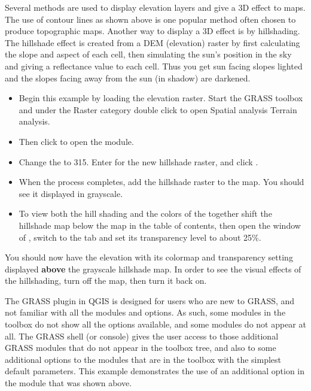 
Several methods are used to display elevation layers and give a 3D effect to
maps. The use of contour lines as shown above is one popular method often
chosen to produce topographic maps. Another way to display a 3D effect is by
hillshading. The hillshade effect is created from a DEM (elevation) raster by
first calculating the slope and aspect of each cell, then simulating the
sun's position in the sky and giving a reflectance value to each cell. Thus
you get sun facing slopes lighted and the slopes facing away from the sun (in
shadow) are darkened.

\begin{itemize}[label=--]
\item Begin this example by loading the  elevation raster.
Start the GRASS toolbox and under the Raster category double click to open Spatial
analysis \arrow Terrain analysis.
\item Then click  to open
the module.
\item Change the  to 315. Enter
 for the new hillshade raster, and click
.
\item When the process completes, add the hillshade raster to the map. You
should see it displayed in grayscale.
\item To view both the hill shading and the colors of the
 together shift the hillshade map below the
 map in the table of contents, then open the
 window of , switch to the
 tab and set its transparency level to about 25\%.
\end{itemize}

You should now have the  elevation with its colormap and
transparency setting displayed \textbf{above} the grayscale hillshade map. In
order to see the visual effects of the hillshading, turn off the
 map, then turn it back on.


The GRASS plugin in QGIS is designed for users who are new to GRASS, and not
familiar with all the modules and options. As such, some modules in the
toolbox do not show all the options available, and some modules do not appear
at all. The GRASS shell (or console) gives the user access to those
additional GRASS modules that do not appear in the toolbox tree, and also to
some additional options to the modules that are in the toolbox with the
simplest default parameters. This example demonstrates the use of an
additional option in the  module that was shown
above.

